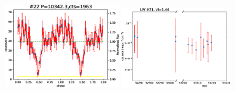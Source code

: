 \documentclass{aastex63}
\begin{document}
\begin{figure}[ht]
\includegraphics[angle =0, width = 0.45\textwidth]{./figure/LW/pfold_lc_153002_cut.eps}
\includegraphics[angle =0, width = 0.43\textwidth]{./figure/LW/153001_lc_cut.eps}
\end{figure}
\end{document}
